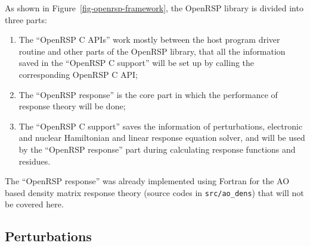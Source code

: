 As shown in Figure~\ref{fig-openrsp-framework}, the OpenRSP library is divided
into three parts:
\begin{enumerate}
  \item The ``OpenRSP C APIs'' work mostly between the host program driver
    routine and other parts of the OpenRSP library, that all the information
    saved in the ``OpenRSP C support'' will be set up by calling the
    corresponding OpenRSP C API;
  \item The ``OpenRSP response'' is the core part in which the performance
    of response theory will be done;
  \item The ``OpenRSP C support'' saves the information of perturbations,
    electronic and nuclear Hamiltonian and linear response equation solver,
    and will be used by the ``OpenRSP response'' part during calculating
    response functions and residues.
\end{enumerate}

The ``OpenRSP response'' was already implemented using Fortran for the AO
based density matrix response theory (source codes in \texttt{src/ao\_dens})
that will not be covered here.

\subsection{Perturbations}
\label{subsection-analysis-perturbation}

